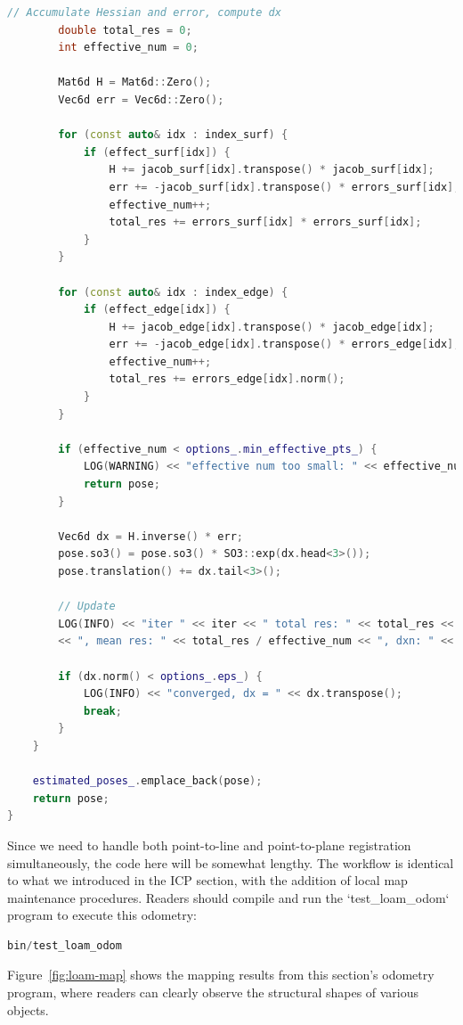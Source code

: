 \begin{lstlisting}[language=c++,caption=src/ch7/loam-like/loam\_like\_odom.cc]
		// Accumulate Hessian and error, compute dx
		double total_res = 0;
		int effective_num = 0;
		
		Mat6d H = Mat6d::Zero();
		Vec6d err = Vec6d::Zero();
		
		for (const auto& idx : index_surf) {
			if (effect_surf[idx]) {
				H += jacob_surf[idx].transpose() * jacob_surf[idx];
				err += -jacob_surf[idx].transpose() * errors_surf[idx];
				effective_num++;
				total_res += errors_surf[idx] * errors_surf[idx];
			}
		}
		
		for (const auto& idx : index_edge) {
			if (effect_edge[idx]) {
				H += jacob_edge[idx].transpose() * jacob_edge[idx];
				err += -jacob_edge[idx].transpose() * errors_edge[idx];
				effective_num++;
				total_res += errors_edge[idx].norm();
			}
		}
		
		if (effective_num < options_.min_effective_pts_) {
			LOG(WARNING) << "effective num too small: " << effective_num;
			return pose;
		}
		
		Vec6d dx = H.inverse() * err;
		pose.so3() = pose.so3() * SO3::exp(dx.head<3>());
		pose.translation() += dx.tail<3>();
		
		// Update
		LOG(INFO) << "iter " << iter << " total res: " << total_res << ", eff: " << effective_num
		<< ", mean res: " << total_res / effective_num << ", dxn: " << dx.norm();
		
		if (dx.norm() < options_.eps_) {
			LOG(INFO) << "converged, dx = " << dx.transpose();
			break;
		}
	}
	
	estimated_poses_.emplace_back(pose);
	return pose;
}
\end{lstlisting}

Since we need to handle both point-to-line and point-to-plane registration simultaneously, the code here will be somewhat lengthy. The workflow is identical to what we introduced in the ICP section, with the addition of local map maintenance procedures. Readers should compile and run the `test_loam_odom` program to execute this odometry:

\begin{lstlisting}[language=c++,caption=Terminal input:]
bin/test_loam_odom 
\end{lstlisting}

Figure~\ref{fig:loam-map} shows the mapping results from this section's odometry program, where readers can clearly observe the structural shapes of various objects.

